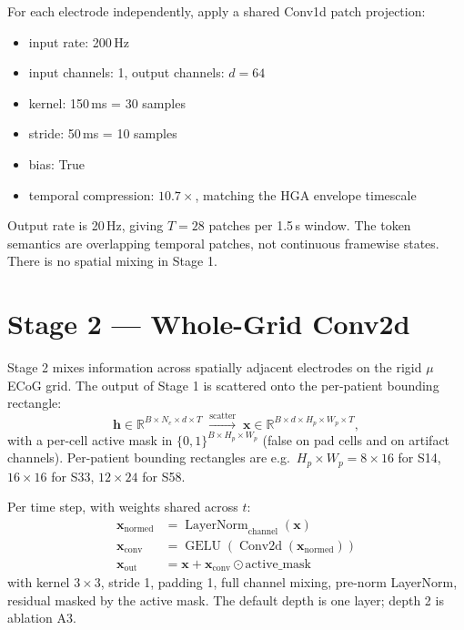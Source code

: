 \documentclass[11pt,letterpaper]{article}
\newcommand{\R}{\mathbb{R}}
\newcommand{\bx}{\mathbf{x}}
\newcommand{\bh}{\mathbf{h}}
\begin{document}
For each electrode independently, apply a shared Conv1d patch projection:
\begin{itemize}[leftmargin=2em, itemsep=0.2em]
\item input rate: 200\,Hz
\item input channels: 1, output channels: $d = 64$
\item kernel: 150\,ms = 30 samples
\item stride: 50\,ms = 10 samples
\item bias: True
\item temporal compression: $10.7\times$, matching the HGA envelope timescale
\end{itemize}

Output rate is 20\,Hz, giving $T = 28$ patches per 1.5\,s window. The token semantics are overlapping temporal patches, not continuous framewise states. There is no spatial mixing in Stage 1.


\section{Stage 2 --- Whole-Grid Conv2d}

Stage 2 mixes information across spatially adjacent electrodes on the rigid $\mu$ECoG grid. The output of Stage 1 is scattered onto the per-patient bounding rectangle:
\begin{equation}
\bh \in \R^{B \times N_e \times d \times T}
\;\xrightarrow{\text{scatter}}\;
\bx \in \R^{B \times d \times H_p \times W_p \times T},
\end{equation}
with a per-cell active mask in $\{0,1\}^{B \times H_p \times W_p}$ (false on pad cells and on artifact channels). Per-patient bounding rectangles are e.g.\ $H_p \times W_p = 8 \times 16$ for S14, $16 \times 16$ for S33, $12 \times 24$ for S58.

Per time step, with weights shared across $t$:
\begin{align}
\bx_{\text{normed}} &= \operatorname{LayerNorm}_{\text{channel}}(\bx) \\
\bx_{\text{conv}}   &= \operatorname{GELU}\!\left(\operatorname{Conv2d}(\bx_{\text{normed}})\right) \\
\bx_{\text{out}}    &= \bx + \bx_{\text{conv}} \odot \text{active\_mask}
\end{align}
with kernel $3\times3$, stride 1, padding 1, full channel mixing, pre-norm LayerNorm, residual masked by the active mask. The default depth is one layer; depth 2 is ablation A3.
\end{document}
